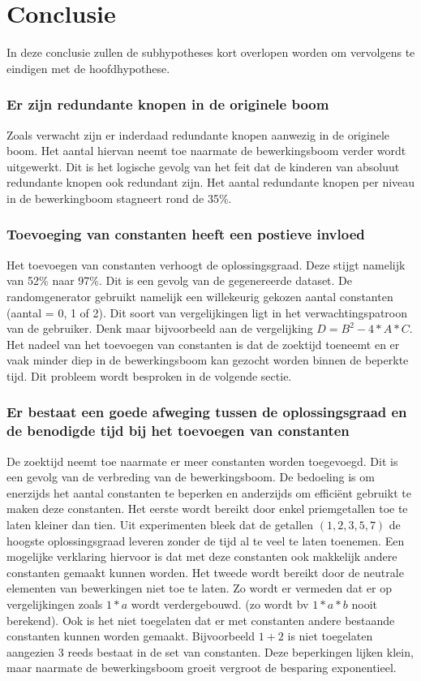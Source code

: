 \documentclass[Main.tex]{subfiles}
\begin{document}
\section{Conclusie}
In deze conclusie zullen de subhypotheses kort overlopen worden om vervolgens te eindigen met de hoofdhypothese.

\subsubsection{Er zijn redundante knopen in de originele boom}
Zoals verwacht zijn er inderdaad redundante knopen aanwezig in de originele boom. Het aantal hiervan neemt toe naarmate de bewerkingsboom verder wordt uitgewerkt. Dit is het logische gevolg van het feit dat de kinderen van absoluut redundante knopen ook redundant zijn. Het aantal redundante knopen per niveau in de bewerkingboom stagneert rond de 35\%.

\subsubsection{Toevoeging van constanten heeft een postieve invloed}
Het toevoegen van constanten verhoogt de oplossingsgraad. Deze stijgt namelijk van 52\% naar 97\%. Dit is een gevolg van de gegenereerde dataset. De randomgenerator gebruikt namelijk een willekeurig gekozen aantal constanten (aantal = 0, 1 of 2). Dit soort van vergelijkingen ligt in het verwachtingspatroon van de gebruiker. Denk maar bijvoorbeeld aan de vergelijking $D = B^{2} - 4 \ast A \ast C$. Het nadeel van het toevoegen van constanten is dat de zoektijd toeneemt en er vaak minder diep in de bewerkingsboom kan gezocht worden binnen de beperkte tijd. Dit probleem wordt besproken in de volgende sectie.

\subsubsection{Er bestaat een goede afweging tussen de oplossingsgraad en de benodigde tijd bij het toevoegen van constanten}
De zoektijd neemt toe naarmate er meer constanten worden toegevoegd. Dit is een gevolg van de verbreding van de bewerkingsboom. De bedoeling is om enerzijds het aantal constanten te beperken en anderzijds om effici\"ent gebruikt te maken deze constanten. Het eerste wordt bereikt door enkel priemgetallen toe te laten kleiner dan tien. Uit experimenten bleek dat de getallen $(1, 2, 3, 5, 7)$ de hoogste oplossingsgraad leveren zonder de tijd al te veel te laten toenemen. Een mogelijke verklaring hiervoor is dat met deze constanten ook makkelijk andere constanten gemaakt kunnen worden. Het tweede wordt bereikt door de neutrale elementen van bewerkingen niet toe te laten. Zo wordt er vermeden dat er op vergelijkingen zoals $1*a$ wordt verdergebouwd. (zo wordt bv $1*a*b$ nooit berekend). Ook is het niet toegelaten dat er met constanten andere bestaande constanten kunnen worden gemaakt. Bijvoorbeeld $1+2$ is niet toegelaten aangezien $3$ reeds bestaat in de set van constanten. Deze beperkingen lijken klein, maar naarmate de bewerkingsboom groeit vergroot de besparing exponentieel.
\end{document}
